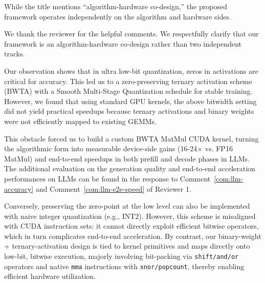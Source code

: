 \begin{revcomment}
While the title mentions ``algorithm-hardware co-design,'' the proposed framework operates independently on the algorithm and hardware sides. 

\end{revcomment}
\begin{revresponse}[]
We thank the reviewer for the helpful comments. We respectfully clarify that our framework is an algorithm-hardware co-design rather than two independent tracks.

Our observation shows that in ultra low-bit quantization, zeros in activations are critical for accuracy. This led us to a zero-preserving ternary activation scheme (BWTA) with a Smooth Multi-Stage Quantization schedule for stable training. 
However, we found that using standard GPU kernels, the above bitwidth setting did not yield practical speedups because ternary activations and binary weights were not efficiently mapped to existing GEMMs. 

This obstacle forced us to build a custom BWTA MatMul CUDA kernel, turning the algorithmic form into measurable device-side gains (16-24$\times$ vs. FP16 MatMul) and end-to-end speedups in both prefill and decode phases in LLMs. The additional evaluation on the generation quality and end-to-end acceleration performances on LLMs can be found in the response to Comment~\ref{com:llm-accuracy} and Comment~\ref{com:llm-e2e-speed} of Reviewer 1. 

Conversely, preserving the zero-point at the low level can also be implemented with naive integer quantization (e.g., INT2). However, this scheme is misaligned with CUDA instruction sets: it cannot directly exploit efficient bitwise operators, which in turn complicates end-to-end acceleration. By contrast, our binary-weight + ternary-activation design is tied to kernel primitives and maps directly onto low-bit, bitwise execution, majorly involving bit-packing via \texttt{shift/and/or} operators and native \texttt{mma} instructions with \texttt{xnor/popcount}, thereby enabling efficient hardware utilization.

\end{revresponse}

